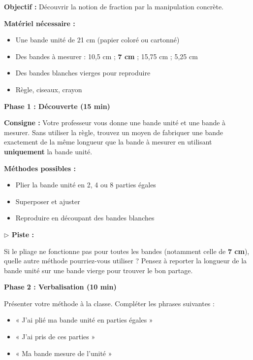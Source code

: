 \begin{activitybox}
	\textbf{Objectif :} Découvrir la notion de fraction par la manipulation concrète.

	\textbf{Matériel nécessaire :}
	\begin{itemize}
		\item Une bande unité de 21 cm (papier coloré ou cartonné)
		\item Des bandes à mesurer : 10,5 cm ; \textbf{7 cm} ; 15,75 cm ; 5,25 cm
		\item Des bandes blanches vierges pour reproduire
		\item Règle, ciseaux, crayon
	\end{itemize}

	\medskip

	\textbf{Phase 1 : Découverte (15 min)}

	\textbf{Consigne :} Votre professeur vous donne une bande unité et une bande à mesurer. Sans utiliser la règle, trouvez un moyen de fabriquer une bande exactement de la même longueur que la bande à mesurer en utilisant \textbf{uniquement} la bande unité.

	\textbf{Méthodes possibles :}
	\begin{itemize}
		\item Plier la bande unité en 2, 4 ou 8 parties égales
		\item Superposer et ajuster
		\item Reproduire en découpant des bandes blanches
	\end{itemize}

	\begin{remarkbox}
		\textbf{$\triangleright$ Piste :}

		Si le pliage ne fonctionne pas pour toutes les bandes (notamment celle de \textbf{7 cm}), quelle autre méthode pourriez-vous utiliser ? Pensez à reporter la longueur de la bande unité sur une bande vierge pour trouver le bon partage.
	\end{remarkbox}

	\trous{10cm}

	\medskip

	\textbf{Phase 2 : Verbalisation (10 min)}

	Présenter votre méthode à la classe. Compléter les phrases suivantes :

	\begin{itemize}
		\item « J'ai plié ma bande unité en  parties égales »
		\item « J'ai pris  de ces parties »
		\item « Ma bande mesure  de l'unité »
	\end{itemize}


\end{activitybox}
